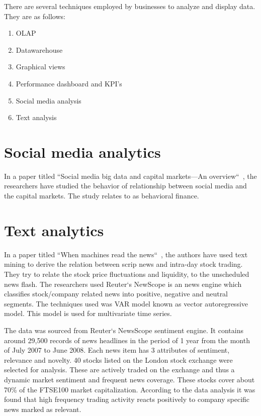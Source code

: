 There are several techniques employed by businesses to analyze and display data. They are as follows:
\begin{enumerate}
	\item OLAP
	\item Datawarehouse
	\item Graphical views
	\item Performance dashboard and KPI's
	\item Social media analysis
	\item Text analysis
\end{enumerate}

\section{Social media analytics}
In a paper titled ``Social media big data and capital markets—An overview``~, the researchers have studied the behavior of relationship between social media and the capital markets. The study relates to as behavioral finance. 

\section{Text analytics}
In a paper titled ``When machines read the news``~, the authors have used text mining to derive the relation between scrip news and intra-day stock trading. They try to relate the stock price fluctuations and liquidity, to the unscheduled news flash. The researchers used Reuter`s NewScope is an news engine which classifies stock/company related news into positive, negative and neutral segments. The techniques used was VAR model known as vector autoregressive model. This model is used for multivariate time series. 

The data was sourced from Reuter`s NewsScope sentiment engine. It contains around 29,500 records of news headlines in the period of 1 year from the month of July 2007 to June 2008. Each news item has 3 attributes of sentiment, relevance and novelty. 40 stocks listed on the London stock exchange were selected for analysis. These are actively traded on the exchange and thus a dynamic market sentiment and frequent news coverage. These stocks cover about 70\% of the FTSE100 market capitalization. 
According to the data analysis it was found that high frequency trading activity reacts positively to company specific news marked as relevant.

